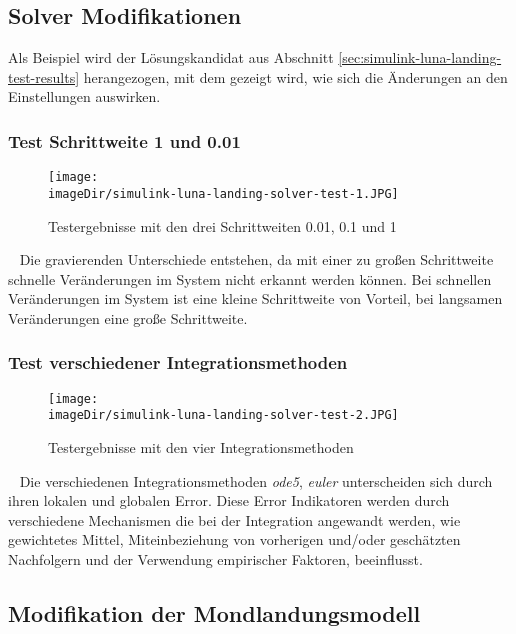 \subsection{Solver Modifikationen}
\label{sec:sub-simulink-solver-luna-landing}
Als Beispiel wird der Lösungskandidat aus Abschnitt \ref{sec:simulink-luna-landing-test-results} herangezogen, mit dem gezeigt wird, wie sich die Änderungen an den Einstellungen auswirken.

\subsubsection{Test Schrittweite 1 und 0.01}
\begin{figure}[h]
	\centering
	\texttt{[image: \\imageDir/simulink-luna-landing-solver-test-1.JPG]}
	\caption{Testergebnisse mit den drei Schrittweiten 0.01, 0.1 und 1}
	\label{fig:simulink-luna-landing-solver-test-1-1}
\end{figure}
\ \newline
Die gravierenden Unterschiede entstehen, da mit einer zu großen Schrittweite schnelle Veränderungen im System nicht erkannt werden können. Bei schnellen Veränderungen im System ist eine kleine Schrittweite von Vorteil, bei langsamen Veränderungen eine große Schrittweite.

\subsubsection{Test verschiedener Integrationsmethoden}
\begin{figure}[h]
	\centering
	\texttt{[image: \\imageDir/simulink-luna-landing-solver-test-2.JPG]}
	\caption{Testergebnisse mit den vier Integrationsmethoden}
	\label{fig:simulink-luna-landing-solver-test-1-1}
\end{figure}
\ \newline
Die verschiedenen Integrationsmethoden \emph{ode5}, \emph{euler} unterscheiden sich durch ihren lokalen und globalen Error. Diese Error Indikatoren werden  durch verschiedene Mechanismen die bei der Integration angewandt werden, wie gewichtetes Mittel, Miteinbeziehung von vorherigen und/oder geschätzten Nachfolgern und der Verwendung empirischer Faktoren, beeinflusst.
\newpage

\subsection{Modifikation der Mondlandungsmodell}
\label{sec:sub-simulink-modified-model-luna-landing}

